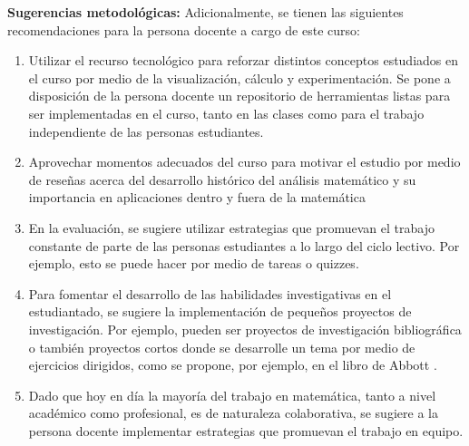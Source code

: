 \begin{refsection}
\textbf{Sugerencias metodológicas:} Adicionalmente, se tienen las siguientes recomendaciones para la persona docente a cargo de este curso:
\begin{enumerate}
    \item Utilizar el recurso tecnológico para reforzar distintos conceptos estudiados en el curso por medio de la visualización, cálculo y experimentación. Se pone a disposición de la persona docente un repositorio de herramientas listas para ser implementadas en el curso, tanto en las clases como para el trabajo independiente de las personas estudiantes.
    \item Aprovechar momentos adecuados del curso para motivar el estudio por medio de reseñas acerca del desarrollo histórico del análisis matemático y su importancia en aplicaciones dentro y fuera de la matemática
    \item En la evaluación, se sugiere utilizar estrategias que promuevan el trabajo constante de parte de las personas estudiantes a lo largo del ciclo lectivo. Por ejemplo, esto se puede hacer por medio de tareas o quizzes.
    \item Para fomentar el desarrollo de las habilidades investigativas en el estudiantado, se sugiere la implementación de pequeños proyectos de investigación. Por ejemplo, pueden ser proyectos de investigación bibliográfica o también proyectos cortos donde se desarrolle un tema por medio de ejercicios dirigidos, como se propone, por ejemplo, en el libro de Abbott \cite{Abb15}.
    \item Dado que hoy en día la mayoría del trabajo en matemática, tanto a nivel académico como profesional, es de naturaleza colaborativa, se sugiere a la persona docente implementar estrategias que promuevan el trabajo en equipo.
\end{enumerate}



\nocite{doC16}
\nocite{Kuh15}


\printbibliography[heading=subbibliography]
\end{refsection}
